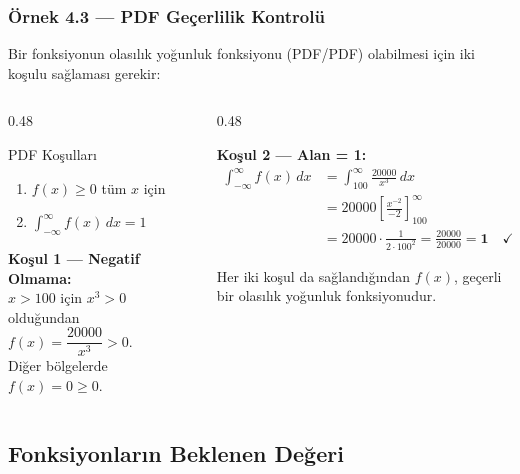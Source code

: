 \documentclass[light]{lutbeamer}
\begin{document}
\begin{frame}[fragile]
  \frametitle[Örnek 4.3 PDF]{Örnek 4.3 --- PDF Geçerlilik Kontrolü}
  {\small Bir fonksiyonun olasılık yoğunluk fonksiyonu (PDF/PDF) olabilmesi için iki koşulu sağlaması gerekir:}

  \begin{columns}[t,onlytextwidth]
    \begin{column}{0.48\textwidth}
      \begin{block}{PDF Koşulları}
        {\footnotesize
        \begin{enumerate}
          \item $f(x) \geq 0$ \quad tüm $x$ için
          \item $\displaystyle\int_{-\infty}^{\infty} f(x)\,dx = 1$
        \end{enumerate}
        }
      \end{block}

      {\footnotesize
      \textbf{Koşul 1 --- Negatif Olmama:}\\
      $x > 100$ için $x^3 > 0$ olduğundan
      $f(x) = \dfrac{20000}{x^3} > 0$.\\
      Diğer bölgelerde $f(x)=0 \geq 0$. \checkmark
      }
    \end{column}

    \begin{column}{0.48\textwidth}
      {\footnotesize
      \textbf{Koşul 2 --- Alan = 1:}
      \begin{align*}
        \int_{-\infty}^{\infty} f(x)\,dx
          &= \int_{100}^{\infty} \frac{20000}{x^3}\,dx \\
          &= 20000 \left[\frac{x^{-2}}{-2}\right]_{100}^{\infty} \\
          &= 20000 \cdot \frac{1}{2 \cdot 100^{2}}
           = \frac{20000}{20000}
           = \mathbf{1} \quad \checkmark
      \end{align*}

      Her iki koşul da sağlandığından $f(x)$, geçerli bir olasılık yoğunluk fonksiyonudur.
      }
    \end{column}
  \end{columns}
\end{frame}

\subsection{Fonksiyonların Beklenen Değeri}
\end{document}
